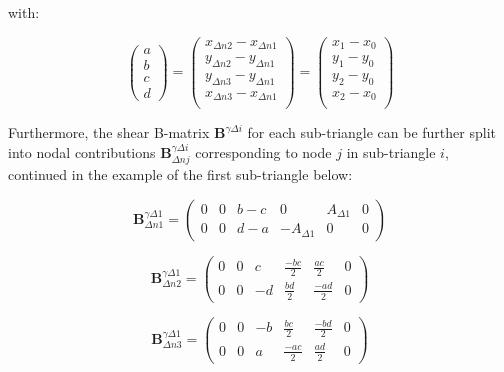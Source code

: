 with:

\begin{equation} 
\begin{pmatrix}
a \\
b \\
c \\
d
\end{pmatrix}
=
\begin{pmatrix}
x_{\Delta n2} - x_{\Delta n1} \\
y_{\Delta n2} - y_{\Delta n1} \\
y_{\Delta n3} - y_{\Delta n1} \\
x_{\Delta n3} - x_{\Delta n1} \\
\end{pmatrix}
=
\begin{pmatrix}
x_{1} - x_{0} \\
y_{1} - y_{0} \\
y_{2} - y_{0} \\
x_{2} - x_{0} \\
\end{pmatrix}
\label{eqCSDSG3_0}
\end{equation}

 Furthermore, the shear B-matrix $\mathbf{B}^{\gamma\Delta i}$ for each sub-triangle can be further split into nodal contributions $\mathbf{B}_{\Delta nj}^{\gamma\Delta i}$ corresponding to node $j$ in sub-triangle $i$, continued in the example of the first sub-triangle below:
 
\begin{equation} 
\mathbf{B}_{\Delta n1}^{\gamma\Delta 1}
 =
\begin{pmatrix}
 0 & 0 & b-c & 0 & A_{\Delta 1} & 0 \\
 0 & 0 & d-a & -A_{\Delta 1} & 0 & 0 
\end{pmatrix}
 \label{eqCSDSG4}
 \end{equation}
 
  \begin{equation} 
\mathbf{B}_{\Delta n2}^{\gamma\Delta 1}
=
\begin{pmatrix}
0 & 0 & c & \frac{-bc}{2} & \frac{ac}{2} & 0 \\
0 & 0 & -d & \frac{bd}{2} & \frac{-ad}{2} & 0
\end{pmatrix}
\label{eqCSDSG5}
\end{equation}

  \begin{equation} 
\mathbf{B}_{\Delta n3}^{\gamma\Delta 1}
=
\begin{pmatrix}
0 & 0 & -b & \frac{bc}{2} & \frac{-bd}{2} & 0 \\
0 & 0 & a & \frac{-ac}{2} & \frac{ad}{2} & 0
\end{pmatrix}
\label{eqCSDSG6}
\end{equation}

